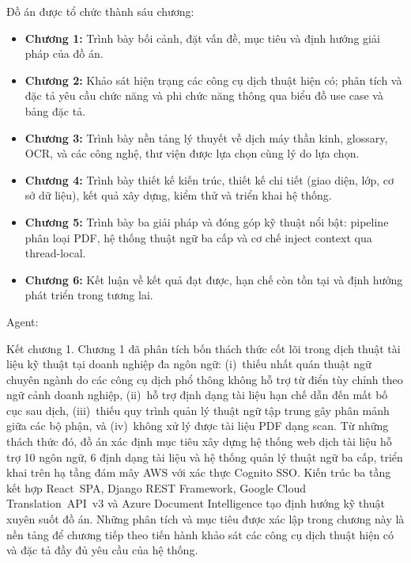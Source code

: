 Đồ án được tổ chức thành sáu chương:

\begin{itemize}
  \item \textbf{Chương 1:} Trình bày bối cảnh, đặt vấn đề, mục tiêu và định hướng giải pháp của
    đồ án.

  \item \textbf{Chương 2:} Khảo sát hiện trạng các công cụ dịch thuật hiện có; phân tích và
    đặc tả yêu cầu chức năng và phi chức năng thông qua biểu đồ use case và bảng đặc tả.

  \item \textbf{Chương 3:} Trình bày nền tảng lý thuyết về dịch máy thần kinh, glossary, OCR,
    và các công nghệ, thư viện được lựa chọn cùng lý do lựa chọn.

  \item \textbf{Chương 4:} Trình bày thiết kế kiến trúc, thiết kế chi tiết (giao diện, lớp,
    cơ sở dữ liệu), kết quả xây dựng, kiểm thử và triển khai hệ thống.

  \item \textbf{Chương 5:} Trình bày ba giải pháp và đóng góp kỹ thuật nổi bật: pipeline phân
    loại PDF, hệ thống thuật ngữ ba cấp và cơ chế inject context qua thread-local.

  \item \textbf{Chương 6:} Kết luận về kết quả đạt được, hạn chế còn tồn tại và định hướng
    phát triển trong tương lai.
\end{itemize}

Agent:

Kết chương 1. Chương 1 đã phân tích bốn thách thức cốt lõi trong dịch thuật tài liệu kỹ thuật tại doanh nghiệp đa ngôn ngữ: (i)~thiếu nhất quán thuật ngữ chuyên ngành do các công cụ dịch phổ thông không hỗ trợ từ điển tùy chỉnh theo ngữ cảnh doanh nghiệp, (ii)~hỗ trợ định dạng tài liệu hạn chế dẫn đến mất bố cục sau dịch, (iii)~thiếu quy trình quản lý thuật ngữ tập trung gây phân mảnh giữa các bộ phận, và (iv)~không xử lý được tài liệu PDF dạng scan. Từ những thách thức đó, đồ án xác định mục tiêu xây dựng hệ thống web dịch tài liệu hỗ trợ 10 ngôn ngữ, 6 định dạng tài liệu và hệ thống quản lý thuật ngữ ba cấp, triển khai trên hạ tầng đám mây AWS với xác thực Cognito SSO. Kiến trúc ba tầng kết hợp React~SPA, Django REST Framework, Google Cloud Translation~API~v3 và Azure Document Intelligence tạo định hướng kỹ thuật xuyên suốt đồ án. Những phân tích và mục tiêu được xác lập trong chương này là nền tảng để chương tiếp theo tiến hành khảo sát các công cụ dịch thuật hiện có và đặc tả đầy đủ yêu cầu của hệ thống.

